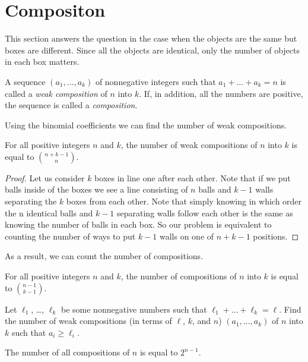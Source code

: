 \section{Compositon}
This section answers the question in the case when the objects
are the same but boxes are different. Since all the objects
are identical, only the number of objects in each box matters.

\begin{definition}
  A sequence $(a_1, \dots, a_k)$ of nonnegative integers such
  that $a_1 + \dots + a_k = n$ is called a \emph{weak composition}
  of $n$ into $k$. If, in addition, all the numbers are positive,
  the sequence is called a \emph{composition}.
\end{definition}

Using the binomial coefficients we can find the number of weak
compositions.
\begin{theorem}
  For all positive integers $n$ and $k$,
  the number of weak compositions of $n$ into $k$ is equal to
  $\binom{n + k - 1}{n}$.
\end{theorem}
\begin{proof}
  Let us consider $k$ boxes in line one after each other. Note that if we
  put balls inside of the boxes we see a line consisting of $n$ balls and
  $k - 1$ walls separating the $k$ boxes from each other. Note that simply
  knowing in which order the n identical balls and $k - 1$ separating walls
  follow each other is the same as knowing the number of balls in each box.
  So our problem is equivalent to counting the number of ways to put $k - 1$
  walls on one of $n + k - 1$ positions.
\end{proof}

As a result, we can count the number of compositions.
\begin{corollary}
  For all positive integers $n$ and $k$,
  the number of compositions of $n$ into $k$ is equal to
  $\binom{n - 1}{k - 1}$.
\end{corollary}

\begin{exercise}
  Let $\ell_1$, \dots, $\ell_k$ be some nonnegative numbers
  such that $\ell_1 + \dots + \ell_k = \ell$.
  Find the number of weak compositions (in terms of $\ell$, $k$, and $n$)
  $(a_1, \dots, a_k)$ of $n$ into $k$ such that $a_i \ge \ell_i$.
\end{exercise}

\begin{corollary}
  The number of all compositions of $n$ is equal to $2^{n - 1}$.
\end{corollary}

